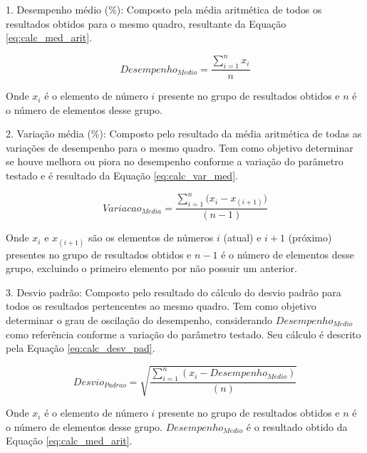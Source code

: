 \documentclass[12pt,oneside,a4paper,chapter=TITLE,section=TITLE,sumario
		=tradicional]{abntex2}
\begin{document}
		\begin{lista}
					
			\item[1.] Desempenho médio (\%): Composto pela média aritmética de todos os resultados obtidos para o mesmo quadro, resultante da Equação \ref{eq:calc_med_arit}.
			
			\begin{equation}
				\label{eq:calc_med_arit}
				Desempenho_{Medio} = \frac{\sum_{i = 1}^{n}{x_i}}{n}
			\end{equation}			
			
			Onde $x_i$ é o elemento de número $i$ presente no grupo de resultados obtidos e $n$ é o número de elementos desse grupo.
			
			\item[2.] Variação média (\%): Composto pelo resultado da média aritmética de todas as variações de desempenho para o mesmo quadro. Tem como objetivo determinar se houve melhora ou piora no desempenho conforme a variação do parâmetro testado e é resultado da Equação \ref{eq:calc_var_med}.
			
			\begin{equation}
				\label{eq:calc_var_med}
				Variacao_{Media} = \frac{\sum_{i = 1}^{n}{(x_i - x_{(i+1)}})}{(n-1)}
			\end{equation}
			
			Onde $x_i$ e $x_{(i+1)}$ são os elementos de números $i$ (atual) e $i+1$ (próximo) presentes no grupo de resultados obtidos e $n-1$ é o número de elementos desse grupo, excluindo o primeiro elemento por não possuir um anterior.
						
			\item[3.] Desvio padrão: Composto pelo resultado do cálculo do desvio padrão para todos os resultados pertencentes ao mesmo quadro. Tem como objetivo determinar o grau de oscilação do desempenho, considerando $Desempenho_{Medio}$ como referência conforme a variação do parâmetro testado. Seu cálculo é descrito pela Equação \ref{eq:calc_desv_pad}.		
			
			\begin{equation}
				\label{eq:calc_desv_pad}
				Desvio_{Padrao} = \sqrt{\frac{\sum_{i = 1}^{n}{(x_i - Desempenho_{Medio})}}{(n)}}
			\end{equation}
			
			Onde $x_i$ é o elemento de número $i$ presente no grupo de resultados obtidos e $n$ é o número de elementos desse grupo. $Desempenho_{Medio}$ é o resultado obtido da Equação \ref{eq:calc_med_arit}.
			

\end{lista}
\end{document}
